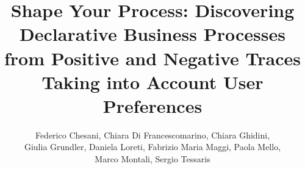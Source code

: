 \documentclass[runningheads]{llncs}
\begin{document}
%
\title{Shape Your Process: Discovering Declarative Business Processes from Positive and Negative Traces Taking into Account User Preferences}

%
%

\author{Federico Chesani, Chiara Di Francescomarino, Chiara Ghidini, \\Giulia Grundler, Daniela Loreti, Fabrizio Maria Maggi, Paola Mello, \\Marco Montali, Sergio Tessaris}
\end{document}
